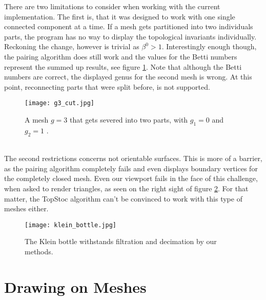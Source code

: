 There are two limitations to consider when working with the current implementation.
The first is, that it was designed to work with one single connected component at a time.
If a mesh gets partitioned into two individuals parts, the program has no way to display the topological invariants individually.
Reckoning the change, however is trivial as $\beta^{0}>1$.
Interestingly enough though, the pairing algorithm does still work and the values for the Betti numbers represent the summed up results, see figure \ref{fig:g3_cut}.
Note that although the Betti numbers are correct, the displayed genus for the second mesh is wrong.
At this point, reconnecting parts that were split before, is not supported. 
\begin{figure}[ht]
\centering
\texttt{[image: g3\_cut.jpg]}
\caption{A mesh $g=3$ that gets severed into two parts, with $g_{1}=0$ and $g_{2}=1$ .}
\label{fig:g3_cut}
\end{figure}\\
The second restrictions concerns not orientable surfaces.
This is more of a barrier, as the pairing algorithm completely fails and even displays boundary vertices for the completely closed mesh.
Even our viewport fails in the face of this challenge, when asked to render triangles, as seen on the right sight of figure \ref{fig:klein_bottle}.
For that matter, the TopStoc algorithm can't be convinced to work with this type of meshes either.
\begin{figure}[ht]
\centering
\texttt{[image: klein\_bottle.jpg]}
\caption{The Klein bottle withstands filtration and decimation by our methods.}
\label{fig:klein_bottle}
\end{figure}


\section{Drawing on Meshes}
\label{topstoc3}

